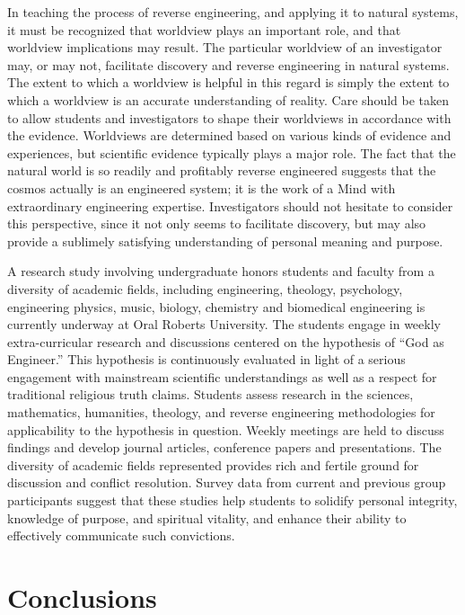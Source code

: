 In teaching the process of reverse engineering, and applying it to
natural systems, it must be recognized that worldview plays an
important role, and that worldview implications may result. The
particular worldview of an investigator may, or may not, facilitate
discovery and reverse engineering in natural systems. The extent to
which a worldview is helpful in this regard is simply the extent to
which a worldview is an accurate understanding of reality. Care should
be taken to allow students and investigators to shape their worldviews
in accordance with the evidence. Worldviews are determined based on
various kinds of evidence and experiences, but scientific evidence
typically plays a major role. The fact that the natural world is so
readily and profitably reverse engineered suggests that the cosmos
actually is an engineered system; it is the work of a Mind with
extraordinary engineering expertise. Investigators should not hesitate
to consider this perspective, since it not only seems to facilitate
discovery, but may also provide a sublimely satisfying understanding of
personal meaning and purpose.


A research study involving undergraduate honors students and faculty
from a diversity of academic fields, including engineering, theology,
psychology, engineering physics, music, biology, chemistry and
biomedical engineering is currently underway at Oral Roberts
University.\citep{halsmerbeck2012} The students engage in weekly
extra-curricular research and discussions centered on the hypothesis of
“God as Engineer.” This hypothesis is continuously evaluated in light
of a serious engagement with mainstream scientific understandings as
well as a respect for traditional religious truth claims. Students
assess research in the sciences, mathematics, humanities, theology, and
reverse engineering methodologies for applicability to the hypothesis
in question. Weekly meetings are held to discuss findings and develop
journal articles, conference papers and presentations. The diversity of
academic fields represented provides rich and fertile ground for
discussion and conflict resolution. Survey data from current and
previous group participants suggest that these studies help students to
solidify personal integrity, knowledge of purpose, and spiritual
vitality, and enhance their ability to effectively communicate such
convictions.

\section{Conclusions}


